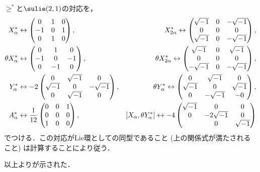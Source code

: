 \begin{npfwn}
  
  $\ge^{*} $と$\sulie(2,1) $の対応を，
  \begin{align*}
    X_{\alpha}^{*} & \leftrightarrow
                     \begin{pmatrix}
                       0 & 1 & 0\\ -1 & 0 & 1\\ 0 & 1 & 0
                     \end{pmatrix},&   X_{2\alpha}^{*}  \leftrightarrow
                     \begin{pmatrix}
                       \sqrt{-1} & 0 & -\sqrt{-1} \\ 0 & 0 & 0\\ \sqrt{-1} & 0 & -\sqrt{-1}
                     \end{pmatrix},\\
    \theta X_{\alpha}^{*} & \leftrightarrow
                     \begin{pmatrix}
                       0 & 1 & 0\\ -1 & 0 & -1\\ 0 & -1 & 0
                     \end{pmatrix},&   \theta X_{2\alpha}^{*}  \leftrightarrow
                     \begin{pmatrix}
                       \sqrt{-1} & 0 & \sqrt{-1} \\ 0 & 0 & 0\\ -\sqrt{-1} & 0 & -\sqrt{-1}
                     \end{pmatrix},\\
    Y_{\alpha}^{*} & \leftrightarrow
                     -2 \begin{pmatrix}
                       0 & \sqrt{-1} & 0\\ \sqrt{-1} & 0 & -\sqrt{-1} \\ 0 & \sqrt{-1} & 0
                     \end{pmatrix},&   \theta Y_{\alpha}^{*}  \leftrightarrow
                     \begin{pmatrix}
                       0 & \sqrt{-1}  & 0 \\ \sqrt{-1} & 0 & \sqrt{-1} \\ 0 & -\sqrt{-1} & -0
                     \end{pmatrix},\\
    A_{\alpha}^{*} & \leftrightarrow
                    \frac{1}{12} \begin{pmatrix}
                       0 & 0 & 1\\ 0 & 0 & 0\\ 1 & 0 & 0
                     \end{pmatrix},&   [X_{\alpha},\theta Y_{\alpha}^{*}] \leftrightarrow
                    -4 \begin{pmatrix}
                       \sqrt{-1} & 0 & 0 \\ 0 & -2\sqrt{-1} & 0\\  & 0 & \sqrt{-1}
                     \end{pmatrix}
  \end{align*}
  でつける．この対応がLie環としての同型であること (上の関係式が満たされること) は計算することにより従う．

  以上よりが示された．  
\end{npfwn}

